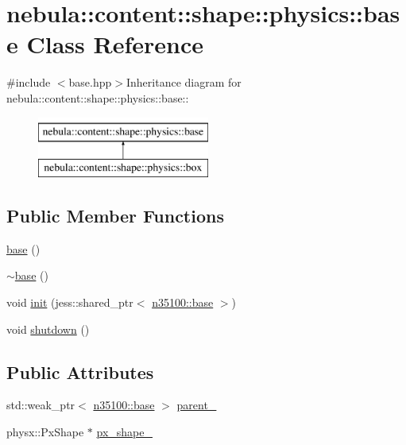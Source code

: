 \hypertarget{classnebula_1_1content_1_1shape_1_1physics_1_1base}{
\section{nebula::content::shape::physics::base Class Reference}
\label{classnebula_1_1content_1_1shape_1_1physics_1_1base}
}


{\ttfamily \#include $<$base.hpp$>$}Inheritance diagram for nebula::content::shape::physics::base::\begin{figure}[H]
\begin{center}
\leavevmode
\includegraphics[height=2cm]{classnebula_1_1content_1_1shape_1_1physics_1_1base}
\end{center}
\end{figure}
\subsection*{Public Member Functions}
\begin{DoxyCompactItemize}
\item 
\hyperlink{classnebula_1_1content_1_1shape_1_1physics_1_1base_aa6da1dcb39a3e7f79b0f4deebec4833a}{base} ()
\item 
\hyperlink{classnebula_1_1content_1_1shape_1_1physics_1_1base_a0ca110f2a34175df9231c1554031a6c9}{$\sim$base} ()
\item 
void \hyperlink{classnebula_1_1content_1_1shape_1_1physics_1_1base_a466f07124cdfc851e4cdd0ec54b86330}{init} (jess::shared\_\-ptr$<$ \hyperlink{classnebula_1_1content_1_1shape_1_1admin_1_1base}{n35100::base} $>$)
\item 
void \hyperlink{classnebula_1_1content_1_1shape_1_1physics_1_1base_a78d06b0deed793d88b08baeb60f18665}{shutdown} ()
\end{DoxyCompactItemize}
\subsection*{Public Attributes}
\begin{DoxyCompactItemize}
\item 
std::weak\_\-ptr$<$ \hyperlink{classnebula_1_1content_1_1shape_1_1admin_1_1base}{n35100::base} $>$ \hyperlink{classnebula_1_1content_1_1shape_1_1physics_1_1base_a13636651ca2a639522b1effe0e86990e}{parent\_\-}
\item 
physx::PxShape $\ast$ \hyperlink{classnebula_1_1content_1_1shape_1_1physics_1_1base_a41958a55327eaa6c06f11c7ca9496bd0}{px\_\-shape\_\-}
\end{DoxyCompactItemize}


